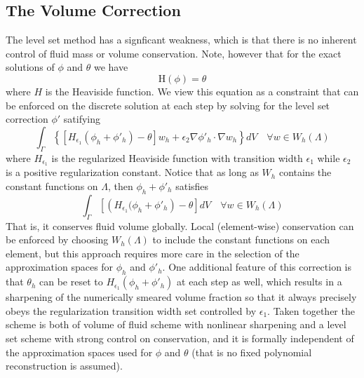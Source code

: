 \documentclass[letterpaper]{erdc}
\begin{document}
\subsection{The Volume Correction}\label{sec:VolumeCorrection}

The level set method has a signficant weakness, which is that there is
no inherent control of fluid mass or volume conservation. Note,
however that for the exact solutions of $\phi$ and $\theta$ we have
\begin{equation}
  \mbox{H}(\phi) = \theta
\end{equation}
where $H$ is the Heaviside function. We view this equation as a constraint that can be enforced on the discrete solution at each step by solving for the level set correction $\phi'$ satifying
\begin{equation}
  \int_{\Gamma} \left\{ \left[ H_{\epsilon_1}\left(\phi_h+\phi'_h \right) - \theta \right] w_h + \epsilon_2 \nabla \phi'_h \cdot \nabla w_h \right\} dV \quad \forall w \in W_h(\Lambda)
\end{equation}
where $H_{\epsilon_1}$ is the regularized Heaviside function with transition width $\epsilon_1$ while $\epsilon_2$ is a positive regularization constant.
Notice that as long as $W_h$ contains the constant functions on $\Lambda$, then $\phi_h+\phi'_h$ satisfies
\begin{equation}
  \int_{\Gamma} \left[ \left(H_{\epsilon_1}(\phi_h+\phi'_h \right) - \theta \right] dV \quad \forall w \in W_h (\Lambda)
\end{equation}
That is, it conserves fluid volume globally. Local (element-wise)
conservation can be enforced by choosing $W_h(\Lambda)$ to include the
constant functions on each element, but this approach requires more
care in the selection of the approximation spaces for $\phi_h$ and
$\phi'_h$. One additional feature of this correction is that
$\theta_h$ can be reset to $H_{\epsilon_1}(\phi_h + \phi'_h)$ at each
step as well, which results in a sharpening of the numerically smeared
volume fraction so that it always precisely obeys the regularization
transition width set controlled by $\epsilon_1$. Taken together the
scheme is both of volume of fluid scheme with nonlinear sharpening and
a level set scheme with strong control on conservation, and it is
formally independent of the approximation spaces used for $\phi$ and
$\theta$ (that is no fixed polynomial reconstruction is assumed). 

%
%
%
\end{document}

